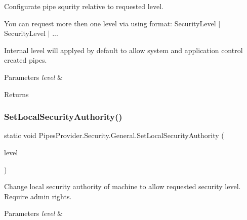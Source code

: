 Configurate pipe squrity relative to requested level. 

You can request more then one level via using format\+: Security\+Level $\vert$ Security\+Level $\vert$ ...

Internal level will applyed by default to allow system and application control created pipes. 


\begin{DoxyParams}{Parameters}
{\em level} & \\
\hline
\end{DoxyParams}
\begin{DoxyReturn}{Returns}

\end{DoxyReturn}
\mbox{\label{class_pipes_provider_1_1_security_1_1_general_a9536a3073883f12e38979f54c6f389d1}} 
\subsubsection{\texorpdfstring{Set\+Local\+Security\+Authority()}{SetLocalSecurityAuthority()}}
{\footnotesize\ttfamily static void Pipes\+Provider.\+Security.\+General.\+Set\+Local\+Security\+Authority (\begin{DoxyParamCaption}\item[{\mbox{\hyperlink{namespace_pipes_provider_1_1_security_a1a6020eca1c661a6f7140e8260502d7e}{Security\+Level}}}]{level }\end{DoxyParamCaption})\hspace{0.3cm}{\ttfamily [static]}}



Change local security authority of machine to allow requested security level. Require admin rights. 


\begin{DoxyParams}{Parameters}
{\em level} & \\
\hline
\end{DoxyParams}
\mbox{\label{class_pipes_provider_1_1_security_1_1_general_ab72cbd58c62e331b7602c6f99ad7cf54}} 

